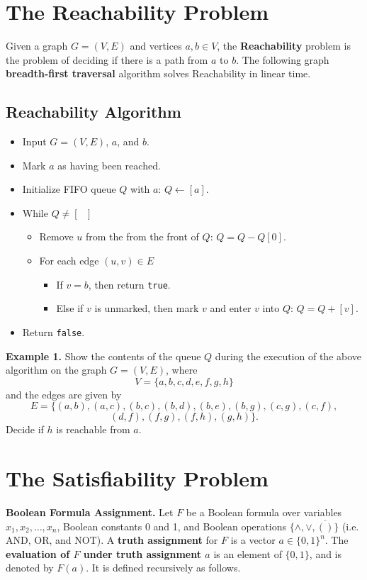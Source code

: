 \documentclass [12pt]{article}
\theoremstyle{definition}
\begin{document}
\section*{The Reachability Problem}

Given a graph $G=(V,E)$ and vertices $a,b\in V$, the \textbf{Reachability} problem is the problem of deciding if there is a path from $a$ to $b$.
The following graph \textbf{breadth-first traversal} algorithm solves Reachability in linear time.

\subsection*{Reachability Algorithm}
\begin{itemize}
 \renewcommand{\labelitemi}{}
 \renewcommand{\labelitemii}{}
 \renewcommand{\labelitemiii}{}
\item Input $G=(V,E)$, $a$, and $b$.
\item Mark $a$ as having been reached.
\item Initialize FIFO queue $Q$ with $a$: $Q\leftarrow[a]$.
\item While $Q\not=[\mbox{ }]$
\begin{itemize}
\item Remove $u$ from the from the front of $Q$: $Q=Q-Q[0]$.
\item For each edge $(u,v)\in E$
\begin{itemize}
\item If $v=b$, then return \texttt{true}.
\item Else if $v$ is unmarked, then mark $v$ and enter $v$ into $Q$: $Q=Q+[v]$.
\end{itemize}
\end{itemize}
\item Return \texttt{false}.
\end{itemize}

{\bf Example 1.} Show the contents of the queue $Q$ during the execution of the above algorithm 
on the graph 
$G=(V,E)$, where \[V=\{a,b,c,d,e,f,g,h\}\] and the edges are given by
\[E=\{(a,b),(a,c),(b,c),(b,d),(b,e),(b,g),(c,g),(c,f),\] 
\[(d,f),(f,g),(f,h),(g,h)\}.\]
Decide if $h$ is reachable from $a$.



\newpage
\section*{The Satisfiability Problem}

{\bf Boolean Formula Assignment.} Let $F$ be a Boolean formula over variables 
$x_{1},x_{2},\ldots ,x_{n}$, Boolean constants 0 and 1,  and Boolean operations $\{\wedge,\vee,\overline{()}\}$ (i.e. AND, OR, and NOT).
A {\bf truth assignment} for $F$ is a vector $a\in\{0,1\}^{n}$. 
The {\bf evaluation of $F$ under truth assignment $a$} is an element of $\{0,1\}$, and is denoted
by
$F(a)$. It is defined recursively as follows. 
\end{document}
